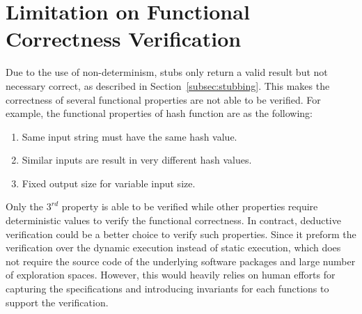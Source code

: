 \section{Limitation on Functional Correctness Verification}
Due to the use of non-determinism, stubs only return a valid result but not necessary correct, as described in Section~\ref{subsec:stubbing}. This makes the correctness of several functional properties are not able to be verified. For example, the functional properties of hash function are as the following:

\begin{enumerate}[nolistsep]
    \item Same input string must have the same hash value.
    \item Similar inputs are result in very different hash values.
    \item Fixed output size for variable input size.
\end{enumerate}

\noindent 
Only the $3^{rd}$ property is able to be verified while other properties require deterministic values to verify the functional correctness. In contract, deductive verification could be a better choice to verify such properties. Since it preform the verification over the dynamic execution instead of static execution, which does not require the source code of the underlying software packages and large number of exploration spaces. However, this would heavily relies on human efforts for capturing the specifications and introducing invariants for each functions to support the verification. 


